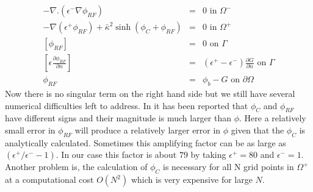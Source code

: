 \begin{eqnarray}
		-\nabla.(\epsilon^- \nabla  \phi_{RF}) &=& 0 \text{ in } \Omega^-\\  
		-\nabla(\epsilon^+ \phi_{RF}) +\bar\kappa^2 \sinh(\phi_C+\phi_{RF})&=& 0 \text{ in } \Omega^+\\
		\left[\phi_{RF}\right] &=& 0 \text{ on } \Gamma \\
		\left[\epsilon\frac{\partial \phi_{RF}}{\partial n}\right]&=& (\epsilon^+-\epsilon^- ) \frac{\partial G}{\partial n} \text{ on } \Gamma\\
		\phi_{RF}&=& \phi_b-G \text{ on } \partial \Omega \label{rf_sys}
\end{eqnarray} 
Now there is no singular term on the right hand side but we still have several numerical difficulties left to address. In \cite{Holst2010} it has been reported that $\phi_C$ and $\phi_{RF}$ have different signs and their magnitude is much larger than $\phi$. Here  a relatively small error in $\phi_{RF}$ will produce a relatively larger error in $\phi$ given that the $\phi_C$ is analytically calculated. Sometimes this amplifying factor \cite{Holst2010} can be as large as $(\epsilon^+/\epsilon^- - 1 )$. In our case this factor is about $79$ by taking $\epsilon^+=80$ and $\epsilon^-=1$. Another problem is, the calculation of $\phi_C$ is necessary for all N grid points in $\Omega^+$ at a computational cost $O(N^2)$ which is very expensive for large $N$. 


